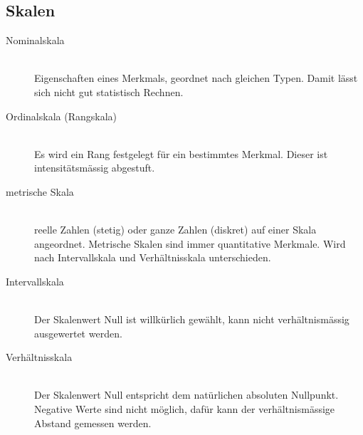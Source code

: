 \subsection{Skalen}
\begin{description}
	\item[Nominalskala] \hfill \\
		Eigenschaften eines Merkmals, geordnet nach gleichen Typen. Damit lässt sich nicht gut statistisch Rechnen.
		
	\item[Ordinalskala (Rangskala)] \hfill \\
		Es wird ein Rang festgelegt für ein bestimmtes Merkmal. Dieser ist intensitätsmässig abgestuft.
		
	\item[metrische Skala] \hfill \\
		reelle Zahlen (stetig) oder ganze Zahlen (diskret) auf einer Skala angeordnet. Metrische Skalen sind immer quantitative Merkmale.
		Wird nach Intervallskala und Verhältnisskala unterschieden.
		
	\item[Intervallskala] \hfill \\
		Der Skalenwert Null ist willkürlich gewählt, kann nicht verhältnismässig ausgewertet werden.
	
	\item[Verhältnisskala] \hfill \\
		Der Skalenwert Null entspricht dem natürlichen absoluten Nullpunkt. Negative Werte sind nicht möglich, dafür kann der verhältnismässige Abstand gemessen werden.
\end{description}

